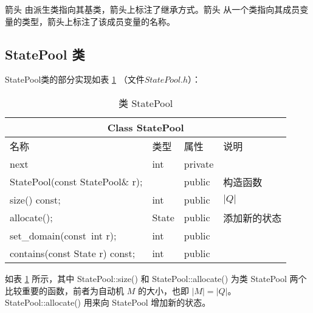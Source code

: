 箭头 {} 由派生类指向其基类，箭头上标注了继承方式。箭头 {} 从一个类指向其成员变量的类型，箭头上标注了该成员变量的名称。

\subsection{StatePool 类}
StatePool类的部分实现如表 \ref{tab:Class-StatePool} （文件$StatePool.h$）：

\begin{table}[!htbp]
    \caption{类 StatePool}
    \label{tab:Class-StatePool}
    \centering
    \small%
    \setlength{\tabcolsep}{4pt}%
    \renewcommand{\arraystretch}{1.2}%
        \begin{tabular}{llll} %
        \toprule 
         \multicolumn{4}{c}{Class StatePool} \\
        \midrule
        名称& 类型 & 属性  &\mbox{说明} \\
        \midrule
        next & int & private &          \\
        \midrule 
        StatePool(const StatePool\& r);& & public &构造函数 \\
        size() const; & int & public &  $|Q|$ \\
        allocate();  &   State &  public &  添加新的状态 \\
        set\_domain(const\ int r); & int & public & \\
        contains(const State r) const; & int & public & \\
        \bottomrule 
    \end{tabular}
\end{table}
如表 \ref{tab:Class-StatePool} 所示，其中 StatePool::size() 和 StatePool::allocate() 为类 StatePool 两个比较重要的函数，前者为自动机 $M$ 的大小，也即 $|M|=|Q|$。 StatePool::allocate() 用来向 StatePool 增加新的状态。
